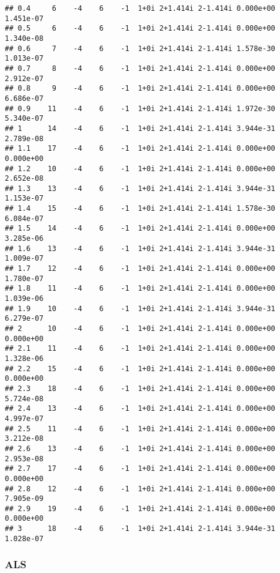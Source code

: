 \documentclass[
  12pt,
]{article}
\begin{document}
\begin{verbatim}
## 0.4     6    -4    6    -1  1+0i 2+1.414i 2-1.414i 0.000e+00 1.451e-07
## 0.5     6    -4    6    -1  1+0i 2+1.414i 2-1.414i 0.000e+00 1.340e-08
## 0.6     7    -4    6    -1  1+0i 2+1.414i 2-1.414i 1.578e-30 1.013e-07
## 0.7     8    -4    6    -1  1+0i 2+1.414i 2-1.414i 0.000e+00 2.912e-07
## 0.8     9    -4    6    -1  1+0i 2+1.414i 2-1.414i 0.000e+00 6.686e-07
## 0.9    11    -4    6    -1  1+0i 2+1.414i 2-1.414i 1.972e-30 5.340e-07
## 1      14    -4    6    -1  1+0i 2+1.414i 2-1.414i 3.944e-31 2.789e-08
## 1.1    17    -4    6    -1  1+0i 2+1.414i 2-1.414i 0.000e+00 0.000e+00
## 1.2    10    -4    6    -1  1+0i 2+1.414i 2-1.414i 0.000e+00 2.652e-08
## 1.3    13    -4    6    -1  1+0i 2+1.414i 2-1.414i 3.944e-31 1.153e-07
## 1.4    15    -4    6    -1  1+0i 2+1.414i 2-1.414i 1.578e-30 6.084e-07
## 1.5    14    -4    6    -1  1+0i 2+1.414i 2-1.414i 0.000e+00 3.285e-06
## 1.6    13    -4    6    -1  1+0i 2+1.414i 2-1.414i 3.944e-31 1.009e-07
## 1.7    12    -4    6    -1  1+0i 2+1.414i 2-1.414i 0.000e+00 1.780e-07
## 1.8    11    -4    6    -1  1+0i 2+1.414i 2-1.414i 0.000e+00 1.039e-06
## 1.9    10    -4    6    -1  1+0i 2+1.414i 2-1.414i 3.944e-31 6.279e-07
## 2      10    -4    6    -1  1+0i 2+1.414i 2-1.414i 0.000e+00 0.000e+00
## 2.1    11    -4    6    -1  1+0i 2+1.414i 2-1.414i 0.000e+00 1.328e-06
## 2.2    15    -4    6    -1  1+0i 2+1.414i 2-1.414i 0.000e+00 0.000e+00
## 2.3    18    -4    6    -1  1+0i 2+1.414i 2-1.414i 0.000e+00 5.724e-08
## 2.4    13    -4    6    -1  1+0i 2+1.414i 2-1.414i 0.000e+00 4.997e-07
## 2.5    11    -4    6    -1  1+0i 2+1.414i 2-1.414i 0.000e+00 3.212e-08
## 2.6    13    -4    6    -1  1+0i 2+1.414i 2-1.414i 0.000e+00 2.953e-08
## 2.7    17    -4    6    -1  1+0i 2+1.414i 2-1.414i 0.000e+00 0.000e+00
## 2.8    12    -4    6    -1  1+0i 2+1.414i 2-1.414i 0.000e+00 7.905e-09
## 2.9    19    -4    6    -1  1+0i 2+1.414i 2-1.414i 0.000e+00 0.000e+00
## 3      18    -4    6    -1  1+0i 2+1.414i 2-1.414i 3.944e-31 1.028e-07
\end{verbatim}

\normalsize

\subsubsection{ALS}\label{als-3}

\footnotesize
\end{document}
